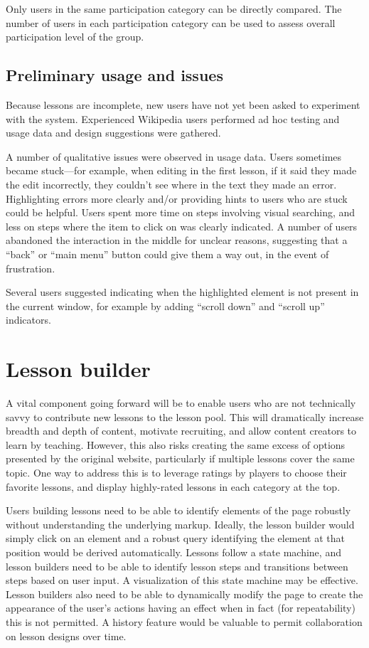 \documentclass{acm_proc_article-sp}
\begin{document}
Only users in the same participation category can be directly compared. The number of users in each participation category can be used to assess overall participation level of the group.

\subsection{Preliminary usage and issues}

Because lessons are incomplete, new users have not yet been asked to
experiment with the system. Experienced Wikipedia users performed 
ad hoc testing and usage data and design suggestions were gathered.

A number of qualitative issues were observed in usage data. Users
sometimes became stuck---for example, when editing in the first lesson,
if it said they made the edit incorrectly, they couldn't see where in the text
they made an error. Highlighting errors more clearly and/or providing
hints to users who are stuck could be helpful. Users spent more time
on steps involving visual searching, and less on steps where the item
to click on was clearly indicated. A number of users
abandoned the interaction in the middle for unclear reasons, suggesting that a ``back'' or
``main menu'' button could give them a way out, in the event of frustration.

Several users suggested indicating when the
highlighted element is not present in the current window, for example by
adding ``scroll down'' and ``scroll up'' indicators. 

\section{Lesson builder}
\label{sec:lessonbuilder}

A vital component going forward will be to enable users who are not technically savvy to contribute new lessons to the lesson pool. This will dramatically increase breadth and depth of content, motivate recruiting, and allow content creators to learn by teaching. However, this also risks creating the same excess of options presented by the original website, particularly if multiple lessons cover the same topic. One way to address this is to leverage ratings by players to choose their favorite lessons, and display highly-rated lessons in each category at the top.

Users building lessons need to be able to identify elements of the page robustly without understanding the underlying markup. Ideally, the lesson builder would simply click on an element and a robust query identifying the element at that position would be derived automatically. Lessons follow a state machine, and lesson builders need to be able to identify lesson steps and transitions between steps based on user input. A visualization of this state machine may be effective. Lesson builders also need to be able to dynamically modify the page to create the appearance of the user's actions having an effect when in fact (for repeatability) this is not permitted. A history feature would be valuable to permit collaboration on lesson designs over time.
\end{document}
